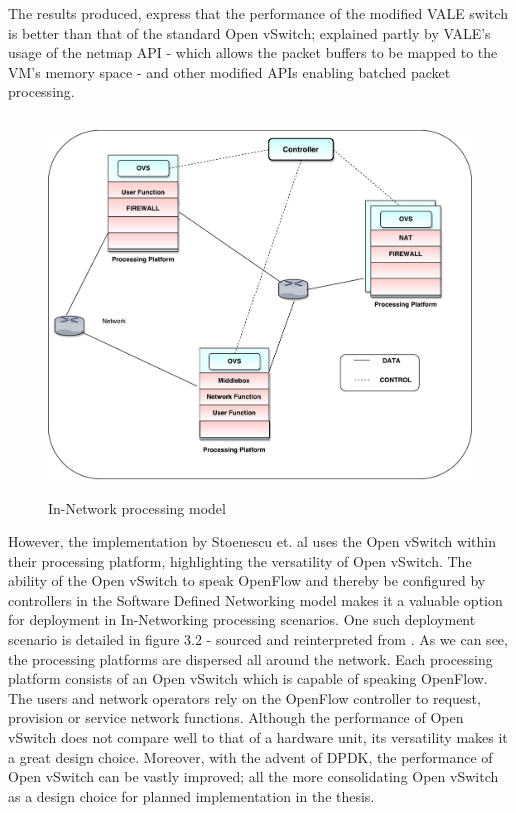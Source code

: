 The results produced, express that the performance of the modified VALE switch is better than that of the standard Open vSwitch; explained partly by VALE's usage of the netmap API - which allows the packet buffers to be mapped to the VM's memory space - and other modified APIs enabling batched packet processing.

 \begin{figure}[H]
 \centering
 \caption{In-Network processing model} 
 \includegraphics[height=10cm]{innet01.pdf} 
\end{figure}

However, the implementation by Stoenescu et. al \cite{NpForMasses} uses the Open vSwitch within their processing platform, highlighting the versatility of Open vSwitch. The ability of the Open vSwitch to speak OpenFlow and thereby be configured by controllers in the Software Defined Networking model makes it a valuable option for deployment in In-Networking processing scenarios. One such deployment scenario is detailed in figure 3.2 - sourced and reinterpreted from \cite{NpForMasses}. As we can see, the processing platforms are dispersed all around the network. Each processing platform consists of an Open vSwitch which is capable of speaking OpenFlow. The users and network operators rely on the OpenFlow controller to request, provision or service network functions. Although the performance of Open vSwitch does not compare well to that of a hardware unit, its versatility makes it a great design choice. Moreover, with the advent of DPDK, the performance of Open vSwitch can be vastly improved; all the more consolidating Open vSwitch as a design choice for planned implementation in the thesis.

